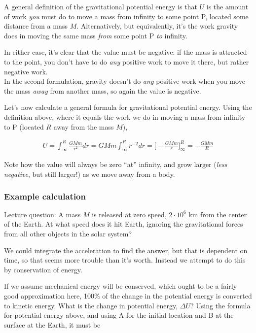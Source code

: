 A general definition of the gravitational potential energy is that $U$ is the amount of work \emph{you} must do to move a mass from infinity to some point P, located some distance from a mass $M$. Alternatively, but equivalently, it's the work gravity does in moving the same mass \emph{from} some point P \emph{to} infinity.

In either case, it's clear that the value must be negative: if the mass is attracted to the point, you don't have to do \emph{any} positive work to move it there, but rather negative work.\\
In the second formulation, gravity doesn't do \emph{any} positive work when you move the mass \emph{away} from another mass, so again the value is negative.

Let's now calculate a general formula for gravitational potential energy. Using the definition above, where it equals the work we do in moving a mass from infinity to P (located $R$ away from the mass $M$),

\begin{align}
U = \int_\infty^R \frac{G M m}{r^2} dr = G M m \int_\infty^R r^{-2} dr = \Big[-\frac{G M m}{r}\Big]_\infty^R = -\frac{G M m}{R}
\end{align}

Note how the value will always be zero ``at'' infinity, and grow larger (\emph{less negative}, but still larger!) as we move away from a body.

\subsubsection{Example calculation}

Lecture question: A mass $M$ is released at zero speed, $2 \cdot 10^6$ km from the center of the Earth. At what speed does it hit Earth, ignoring the gravitational forces from all other objects in the solar system?

We could integrate the acceleration to find the answer, but that is dependent on time, so that seems more trouble than it's worth. 
Instead we attempt to do this by conservation of energy.

If we assume mechanical energy will be conserved, which ought to be a fairly good approximation here, 100\% of the change in the potential energy is converted to kinetic energy. What is the change in potential energy, $\Delta U$? Using the formula for potential energy above, and using A for the initial location and B at the surface at the Earth, it must be

